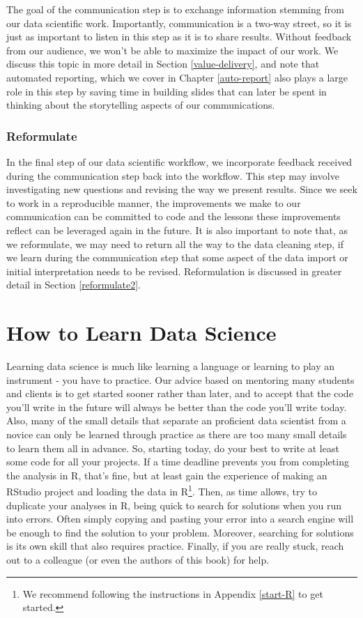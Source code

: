 \documentclass[
]{krantz}
\begin{document}
The goal of the communication step is to exchange information stemming from our data scientific work. Importantly, communication is a two-way street, so it is just as important to listen in this step as it is to share results. Without feedback from our audience, we won't be able to maximize the impact of our work. We discuss this topic in more detail in Section \ref{value-delivery}, and note that automated reporting, which we cover in Chapter \ref{auto-report} also plays a large role in this step by saving time in building slides that can later be spent in thinking about the storytelling aspects of our communications.

\hypertarget{reformulate}{%
\subsubsection*{Reformulate}\label{reformulate}}


In the final step of our data scientific workflow, we incorporate feedback received during the communication step back into the workflow. This step may involve investigating new questions and revising the way we present results. Since we seek to work in a reproducible manner, the improvements we make to our communication can be committed to code and the lessons these improvements reflect can be leveraged again in the future. It is also important to note that, as we reformulate, we may need to return all the way to the data cleaning step, if we learn during the communication step that some aspect of the data import or initial interpretation needs to be revised. Reformulation is discussed in greater detail in Section \ref{reformulate2}.

\hypertarget{how-to-learn-data-science}{%
\section{How to Learn Data Science}\label{how-to-learn-data-science}}

Learning data science is much like learning a language or learning to play an instrument - you have to practice. Our advice based on mentoring many students and clients is to get started sooner rather than later, and to accept that the code you'll write in the future will always be better than the code you'll write today. Also, many of the small details that separate an proficient data scientist from a novice can only be learned through practice as there are too many small details to learn them all in advance. So, starting today, do your best to write at least some code for all your projects. If a time deadline prevents you from completing the analysis in R, that's fine, but at least gain the experience of making an RStudio project and loading the data in R\footnote{We recommend following the instructions in Appendix \ref{start-R} to get started.}. Then, as time allows, try to duplicate your analyses in R, being quick to search for solutions when you run into errors. Often simply copying and pasting your error into a search engine will be enough to find the solution to your problem. Moreover, searching for solutions is its own skill that also requires practice. Finally, if you are really stuck, reach out to a colleague (or even the authors of this book) for help.
\end{document}
